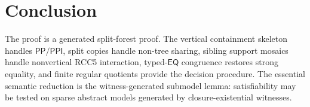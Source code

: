 \documentclass[11pt]{article}
\theoremstyle{remark}
\newcommand{\PP}{\mathsf{PP}}
\newcommand{\PPI}{\mathsf{PPI}}
\newcommand{\EQ}{\mathsf{EQ}}
\begin{document}
\section{Conclusion}
The proof is a generated split-forest proof.  The vertical containment skeleton handles $\PP/\PPI$, split copies handle non-tree sharing, sibling support mosaics handle nonvertical RCC5 interaction, typed-$\EQ$ congruence restores strong equality, and finite regular quotients provide the decision procedure.  The essential semantic reduction is the witness-generated submodel lemma: satisfiability may be tested on sparse abstract models generated by closure-existential witnesses.
\end{document}
